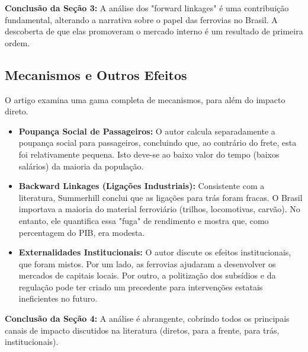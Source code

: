 \documentclass[12pt, a4paper]{article}
\begin{document}
\noindent\textbf{Conclusão da Seção 3:} A análise dos "forward linkages" é uma contribuição fundamental, alterando a narrativa sobre o papel das ferrovias no Brasil. A descoberta de que elas promoveram o mercado interno é um resultado de primeira ordem.

\subsection{Mecanismos e Outros Efeitos}
O artigo examina uma gama completa de mecanismos, para além do impacto direto.
\begin{itemize}
    \item \textbf{Poupança Social de Passageiros:} O autor calcula separadamente a poupança social para passageiros, concluindo que, ao contrário do frete, esta foi relativamente pequena. Isto deve-se ao baixo valor do tempo (baixos salários) da maioria da população.
    \item \textbf{Backward Linkages (Ligações Industriais):} Consistente com a literatura, Summerhill conclui que as ligações para trás foram fracas. O Brasil importava a maioria do material ferroviário (trilhos, locomotivas, carvão). No entanto, ele quantifica essa "fuga" de rendimento e mostra que, como percentagem do PIB, era modesta.
    \item \textbf{Externalidades Institucionais:} O autor discute os efeitos institucionais, que foram mistos. Por um lado, as ferrovias ajudaram a desenvolver os mercados de capitais locais. Por outro, a politização dos subsídios e da regulação pode ter criado um precedente para intervenções estatais ineficientes no futuro.
\end{itemize}

\noindent\textbf{Conclusão da Seção 4:} A análise é abrangente, cobrindo todos os principais canais de impacto discutidos na literatura (diretos, para a frente, para trás, institucionais).
\end{document}
